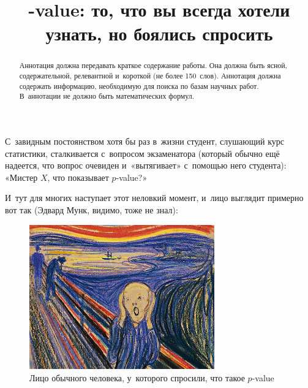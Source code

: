 \documentclass[final,pdftex]{../../template/epsilonj}
\begin{document}
	
	\begin{frontmatter}
		\title{-value: то, что вы всегда хотели узнать, но боялись спросить}
		
		\begin{aug}
			\author{ }
			\address{НИУ ВШЭ, Москва.}
		\end{aug}
		
		\begin{abstract}
			Аннотация должна передавать краткое содержание работы.
			Она должна быть ясной, содержательной, релевантной и~короткой
			(не более 150~слов). Аннотация должна содержать информацию,
			необходимую для поиска по базам научных работ.
			В~аннотации не должно быть математических формул.
		\end{abstract}
		
		\begin{keyword}
		\end{keyword}
		
	\end{frontmatter}
	


С~завидным постоянством хотя бы раз в~жизни студент, слушающий курс статистики, сталкивается с~вопросом экзаменатора (который обычно ещё надеется, что вопрос очевиден и~«вытягивает» с~помощью него студента): «Мистер $X$, что показывает $p$-value?»

И~тут для многих наступает этот неловкий момент, и~лицо выглядит примерно вот так (Эдвард Мунк, видимо, тоже не знал):

\begin{figure}[htbp]
	\centering
	\includegraphics[width=8cm]{munk-small.jpg}
	\caption{Лицо обычного человека, у~которого спросили, что такое $p$-value}
\end{figure}
\end{document}

